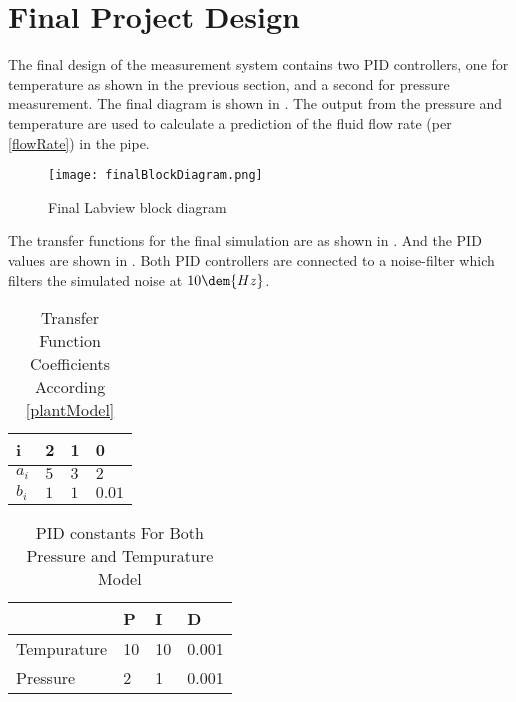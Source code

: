 \documentclass[main.tex]{subfile}
\begin{document}
\section{Final Project Design} 
\label{sec:final_project_design}

The final design of the measurement system contains two PID controllers, one for
temperature as shown in the previous section, and a second for pressure
measurement. The final diagram is shown in . The output
from the pressure and temperature are used to calculate a prediction of the
fluid flow rate (per \eqref{flowRate}) in the pipe.

\begin{figure}[h]
	\begin{center}
		\texttt{[image: finalBlockDiagram.png]}
	\end{center}
	\caption{Final Labview block diagram}
	\label{fig:finalDiagram}
\end{figure}

The transfer functions for the final simulation are as shown in .
And the PID values are shown in . Both PID controllers are
connected to a noise-filter which filters the simulated noise at $10\dem{Hz}$.

\begin{table}[H]
  \begin{center}
		\caption{Transfer Function Coefficients According \eqref{plantModel}}
    \label{tab:coeffs}
    \begin{tabular}{llll}
      \\ \toprule
			  i & 2 & 1 & 0
      \\ \midrule
			  $a_i$ & $5$ & $3$ & $2$
			\\$b_i$ & $1$ & $1$ & $0.01$
      \\ \bottomrule
    \end{tabular}
  \end{center}
\end{table}

\begin{table}[H]
  \begin{center}
    \caption{PID constants For Both Pressure and Tempurature Model}
    \label{tab:pids}
    \begin{tabular}{llll}
      \\ \toprule
			& P & I & D
      \\ \midrule
			Tempurature & 10 & 10 & 0.001
			\\Pressure & 2 & 1 & 0.001
      \\ \bottomrule
    \end{tabular}
  \end{center}
\end{table}
\end{document}

